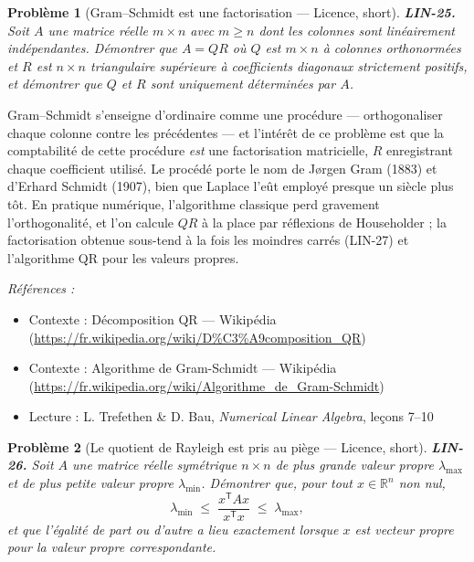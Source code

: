 \documentclass[11pt]{article}
\newtheorem{problem}{Problème}
\newenvironment{refs}{\par\small\noindent\emph{Références :}\begin{itemize}\setlength\itemsep{0pt}}{\end{itemize}\normalsize}
\begin{document}
\bigskip

\begin{problem}[{Gram--Schmidt est une factorisation --- Licence, short}]
\textbf{LIN-25.} Soit $A$ une matrice réelle $m \times n$ avec $m \ge n$
dont les colonnes sont linéairement indépendantes. Démontrer que $A = QR$ où $Q$ est
$m \times n$ à colonnes orthonormées et $R$ est $n \times n$ triangulaire supérieure à
coefficients diagonaux strictement positifs, et démontrer que $Q$ et $R$ sont uniquement
déterminées par $A$.
\end{problem}

\noindent Gram--Schmidt s'enseigne d'ordinaire comme une procédure --- orthogonaliser chaque
colonne contre les précédentes --- et l'intérêt de ce problème est que la comptabilité de cette
procédure \textit{est} une factorisation matricielle, $R$ enregistrant chaque coefficient utilisé. Le
procédé porte le nom de Jørgen Gram (1883) et d'Erhard Schmidt (1907), bien que Laplace l'eût employé
presque un siècle plus tôt. En pratique numérique, l'algorithme classique perd gravement
l'orthogonalité, et l'on calcule $QR$ à la place par réflexions de Householder ; la factorisation
obtenue sous-tend à la fois les moindres carrés (LIN-27) et l'algorithme QR pour les valeurs
propres.

\begin{refs}
\item Contexte : Décomposition QR --- Wikipédia (\url{https://fr.wikipedia.org/wiki/D%C3%A9composition_QR})
\item Contexte : Algorithme de Gram-Schmidt --- Wikipédia (\url{https://fr.wikipedia.org/wiki/Algorithme_de_Gram-Schmidt})
\item Lecture : L. Trefethen \& D. Bau, \textit{Numerical Linear Algebra}, leçons 7--10
\end{refs}

\bigskip

\begin{problem}[{Le quotient de Rayleigh est pris au piège --- Licence, short}]
\textbf{LIN-26.} Soit $A$ une matrice réelle symétrique $n \times n$ de plus
grande valeur propre $\lambda_{\max}$ et de plus petite valeur propre $\lambda_{\min}$. Démontrer
que, pour tout $x \in \mathbb{R}^n$ non nul,
\[ \lambda_{\min} \;\le\; \frac{x^{\mathsf{T}} A x}{x^{\mathsf{T}} x} \;\le\; \lambda_{\max}, \]
et que l'égalité de part ou d'autre a lieu exactement lorsque $x$ est vecteur propre pour la valeur
propre correspondante.
\end{problem}
\end{document}
